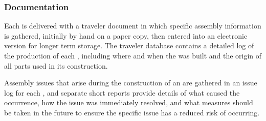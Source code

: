 \subsubsection{Documentation} 
\label{sec:fdsp-apa-prod-doc}

Each  is delivered with a traveler document in which specific assembly information is gathered, initially by hand on a paper copy, then entered into an electronic version for longer term storage.  The traveler database contains a detailed log of the production of each , including where and when the  was built and the origin of all parts used in its construction. 

Assembly issues that arise during the construction of an  are gathered in an issue log for each , and separate short reports provide details of what caused the occurrence, how the issue was immediately resolved, and what measures should be taken in the future to ensure the specific issue has a reduced risk of occurring.  


